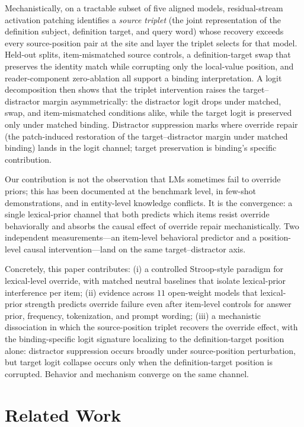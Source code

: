 \documentclass[11pt]{article}
\begin{document}
Mechanistically, on a tractable subset of five aligned models, residual-stream activation
patching identifies a \emph{source triplet} (the joint representation of the definition
subject, definition target, and query word) whose recovery exceeds every source-position pair
at the site and layer the triplet selects for that model. Held-out splits, item-mismatched
source controls, a definition-target swap that preserves the identity match while corrupting
only the local-value position, and reader-component zero-ablation all support a binding
interpretation. A logit decomposition then shows that the triplet intervention raises the
target--distractor margin asymmetrically: the distractor logit drops under matched, swap, and
item-mismatched conditions alike, while the target logit is preserved only under matched
binding. Distractor suppression marks where override repair (the patch-induced restoration of the
target--distractor margin under matched binding) lands in the logit channel; target
preservation is binding's specific contribution.

Our contribution is not the observation that LMs sometimes fail to override priors; this has
been documented at the benchmark level, in few-shot demonstrations, and in entity-level
knowledge conflicts. It is the
convergence: a single lexical-prior channel that both predicts which items resist override
behaviorally and absorbs the causal effect of override repair mechanistically. Two
independent measurements---an item-level behavioral predictor and a position-level causal
intervention---land on the same target--distractor axis.

Concretely, this paper contributes: (i) a controlled Stroop-style paradigm for lexical-level
override, with matched neutral baselines that isolate lexical-prior interference per item;
(ii) evidence across $11$ open-weight models that lexical-prior strength predicts override
failure even after item-level controls for answer prior, frequency, tokenization, and prompt
wording; (iii) a mechanistic dissociation in which the source-position triplet recovers the override
effect, with the binding-specific logit signature localizing to the definition-target position
alone: distractor suppression occurs broadly under source-position perturbation, but target
logit collapse occurs only when the definition-target position is corrupted. Behavior and
mechanism converge on the same channel.


\section{Related Work}
\label{sec:related}
\end{document}
